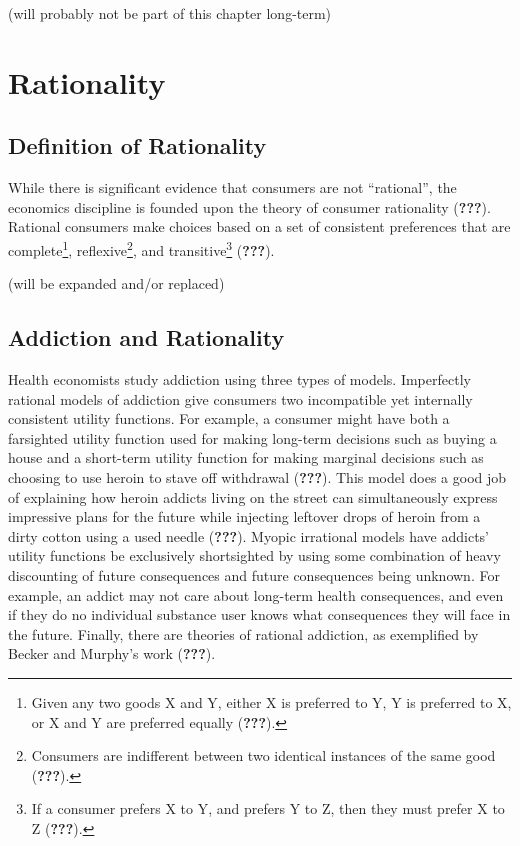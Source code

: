 \documentclass[12pt,twoside]{reedthesis}
\begin{document}
(will probably not be part of this chapter long-term)

\hypertarget{rationality}{%
\chapter{Rationality}\label{rationality}}

\hypertarget{definition-of-rationality}{%
\section{Definition of Rationality}\label{definition-of-rationality}}

While there is significant evidence that consumers are not ``rational'', the economics discipline is founded upon the theory of consumer rationality ({\textbf{???}}). Rational consumers make choices based on a set of consistent preferences that are complete\footnote{Given any two goods X and Y, either X is preferred to Y, Y is preferred to X, or X and Y are preferred equally ({\textbf{???}}).}, reflexive\footnote{Consumers are indifferent between two identical instances of the same good ({\textbf{???}}).}, and transitive\footnote{If a consumer prefers X to Y, and prefers Y to Z, then they must prefer X to Z ({\textbf{???}}).} ({\textbf{???}}).

(will be expanded and/or replaced)

\hypertarget{addiction-and-rationality}{%
\section{Addiction and Rationality}\label{addiction-and-rationality}}

Health economists study addiction using three types of models. Imperfectly rational models of addiction give consumers two incompatible yet internally consistent utility functions. For example, a consumer might have both a farsighted utility function used for making long-term decisions such as buying a house and a short-term utility function for making marginal decisions such as choosing to use heroin to stave off withdrawal ({\textbf{???}}). This model does a good job of explaining how heroin addicts living on the street can simultaneously express impressive plans for the future while injecting leftover drops of heroin from a dirty cotton using a used needle ({\textbf{???}}). Myopic irrational models have addicts' utility functions be exclusively shortsighted by using some combination of heavy discounting of future consequences and future consequences being unknown. For example, an addict may not care about long-term health consequences, and even if they do no individual substance user knows what consequences they will face in the future. Finally, there are theories of rational addiction, as exemplified by Becker and Murphy's work ({\textbf{???}}).
\end{document}
